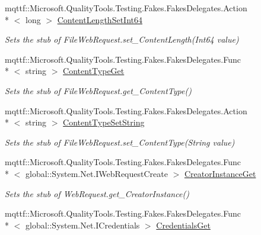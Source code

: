 \begin{DoxyCompactItemize}
mqttf\-::\-Microsoft.\-Quality\-Tools.\-Testing.\-Fakes.\-Fakes\-Delegates.\-Action\\*
$<$ long $>$ \hyperlink{class_system_1_1_net_1_1_fakes_1_1_stub_file_web_request_af4da4863fbcfe3a9997e0cc8c35d1313}{Content\-Length\-Set\-Int64}
\begin{DoxyCompactList}\small\item\em Sets the stub of File\-Web\-Request.\-set\-\_\-\-Content\-Length(\-Int64 value)\end{DoxyCompactList}\item 
mqttf\-::\-Microsoft.\-Quality\-Tools.\-Testing.\-Fakes.\-Fakes\-Delegates.\-Func\\*
$<$ string $>$ \hyperlink{class_system_1_1_net_1_1_fakes_1_1_stub_file_web_request_a2855016c2c431666cc9d04caa7220830}{Content\-Type\-Get}
\begin{DoxyCompactList}\small\item\em Sets the stub of File\-Web\-Request.\-get\-\_\-\-Content\-Type()\end{DoxyCompactList}\item 
mqttf\-::\-Microsoft.\-Quality\-Tools.\-Testing.\-Fakes.\-Fakes\-Delegates.\-Action\\*
$<$ string $>$ \hyperlink{class_system_1_1_net_1_1_fakes_1_1_stub_file_web_request_a567cebf037b3eb7f6c010064534c3c39}{Content\-Type\-Set\-String}
\begin{DoxyCompactList}\small\item\em Sets the stub of File\-Web\-Request.\-set\-\_\-\-Content\-Type(\-String value)\end{DoxyCompactList}\item 
mqttf\-::\-Microsoft.\-Quality\-Tools.\-Testing.\-Fakes.\-Fakes\-Delegates.\-Func\\*
$<$ global\-::\-System.\-Net.\-I\-Web\-Request\-Create $>$ \hyperlink{class_system_1_1_net_1_1_fakes_1_1_stub_file_web_request_a9611aa8b24e4a039d14a3aa62a975e53}{Creator\-Instance\-Get}
\begin{DoxyCompactList}\small\item\em Sets the stub of Web\-Request.\-get\-\_\-\-Creator\-Instance()\end{DoxyCompactList}\item 
mqttf\-::\-Microsoft.\-Quality\-Tools.\-Testing.\-Fakes.\-Fakes\-Delegates.\-Func\\*
$<$ global\-::\-System.\-Net.\-I\-Credentials $>$ \hyperlink{class_system_1_1_net_1_1_fakes_1_1_stub_file_web_request_af34dcda5b992990cc44b3a84e5fe8253}{Credentials\-Get}

\end{DoxyCompactItemize}
